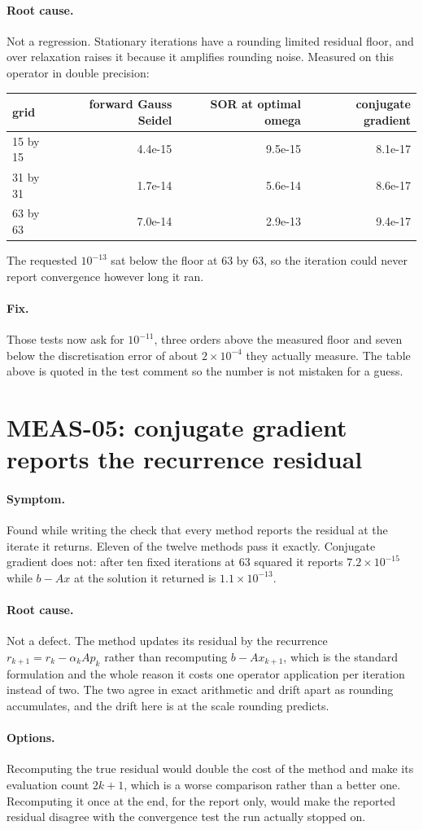 \documentclass[11pt,a4paper]{report}
\newcommand{\symptom}[1]{\paragraph{Symptom.}#1}
\newcommand{\rootcause}[1]{\paragraph{Root cause.}#1}
\newcommand{\options}[1]{\paragraph{Options.}#1}
\newcommand{\fix}[1]{\paragraph{Fix.}#1}
\begin{document}
\rootcause{Not a regression. Stationary iterations have a rounding limited
residual floor, and over relaxation raises it because it amplifies rounding
noise. Measured on this operator in double precision:}

\begin{center}
\begin{tabular}{lrrr}
\toprule
grid & forward Gauss Seidel & SOR at optimal omega & conjugate gradient \\
\midrule
15 by 15 & 4.4e-15 & 9.5e-15 & 8.1e-17 \\
31 by 31 & 1.7e-14 & 5.6e-14 & 8.6e-17 \\
63 by 63 & 7.0e-14 & 2.9e-13 & 9.4e-17 \\
\bottomrule
\end{tabular}
\end{center}

The requested $10^{-13}$ sat below the floor at 63 by 63, so the iteration could
never report convergence however long it ran.

\fix{Those tests now ask for $10^{-11}$, three orders above the measured floor
and seven below the discretisation error of about $2\times10^{-4}$ they actually
measure. The table above is quoted in the test comment so the number is not
mistaken for a guess.}

\section{MEAS-05: conjugate gradient reports the recurrence residual}

\symptom{Found while writing the check that every method reports the residual at
the iterate it returns. Eleven of the twelve methods pass it exactly. Conjugate
gradient does not: after ten fixed iterations at 63 squared it reports
$7.2\times10^{-15}$ while $b - Ax$ at the solution it returned is
$1.1\times10^{-13}$.}

\rootcause{Not a defect. The method updates its residual by the recurrence
$r_{k+1} = r_k - \alpha_k A p_k$ rather than recomputing $b - Ax_{k+1}$, which is
the standard formulation and the whole reason it costs one operator application
per iteration instead of two. The two agree in exact arithmetic and drift apart
as rounding accumulates, and the drift here is at the scale rounding predicts.}

\options{Recomputing the true residual would double the cost of the method and
make its evaluation count $2k + 1$, which is a worse comparison rather than a
better one. Recomputing it once at the end, for the report only, would make the
reported residual disagree with the convergence test the run actually stopped
on.}
\end{document}
